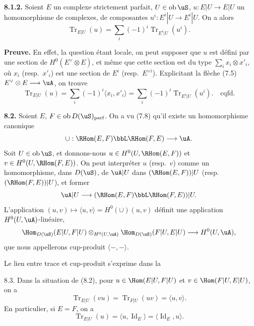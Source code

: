 \smallskip
\noindent\textbf{8.1.2.} Soient $E$ un complexe strictement parfait, $U \in \operatorname{ob} \uS$, $u : E|U \rightarrow E|U$ un homomorphisme de complexes, de composantes $u^i : E^i|U \rightarrow E^i|U$. On a alors
\[
\operatorname{Tr}_{E|U}(u) = \sum_i (-1)^i \operatorname{Tr}_{E^i|U}(u^i) .
\]

\noindent\textbf{Preuve.} En effet, la question \'{e}tant locale, on peut supposer que $u$ est d\'{e}fini par une section de $H^0(E^{\vee} \otimes E)$, et m\^{e}me que cette section est du type $\sum_i x_i \otimes x'_i$, o\`{u} $x_i$ (resp.~$x'_i$) est une section de $E^i$ (resp.~$E^{\vee i}$). Explicitant la fl\`{e}che (7.5) $E^{\vee} \otimes E \longrightarrow \uA$, on trouve
\[
\operatorname{Tr}_{E|U}(u) = \sum_i (-1)^i \langle x_i, x'_i \rangle = \sum_i (-1)^i \operatorname{Tr}_{E^i|U}(u^i) . \quad \text{cqfd.}
\]

\bigskip
\noindent\textbf{8.2.} Soient $E$, $F \in \operatorname{ob} D(\uS)_{\mathrm{parf}}$. On a vu (7.8) qu'il existe un homomorphisme canonique
\[
\cup : \RHom(E,F) \bbL \RHom(F,E) \longrightarrow \uA .
\]
Soit $U \in \operatorname{ob} \uS$, et donnons-nous $u \in H^0(U, \RHom(E,F))$ et $v \in H^0(U, \RHom(F,E))$. On peut interpr\'{e}ter $u$ (resp.~$v$) comme un homomorphisme, dans $D(\uS)$, de $\uA|U$ dans $(\RHom(E,F))|U$ (resp.~$(\RHom(F,E))|U$), et former
\[
\uA|U \longrightarrow (\RHom(E,F) \bbL \RHom(F,E))|U .
\]
L'application $(u,v) \mapsto \langle u,v \rangle = H^0(\cup)(u,v)$ d\'{e}finit une application $H^0(U,\uA)$-lin\'{e}aire,
\[
\Hom_{D(\uS)}(E|U, F|U) \otimes_{H^0(U,\uA)} \Hom_{D(\uS)}(F|U, E|U) \longrightarrow H^0(U,\uA) ,
\]
que nous appellerons cup-produit $\langle -,- \rangle$.

Le lien entre trace et cup-produit s'exprime dans la

\begin{proposition} 8.3.
Dans la situation de (8.2), pour $u \in \Hom(E|U, F|U)$ et $v \in \Hom(F|U, E|U)$, on a
\[
\operatorname{Tr}_{E|U}(vu) = \operatorname{Tr}_{F|U}(uv) = \langle u,v \rangle .
\]
En particulier, si $E = F$, on a
\[
\operatorname{Tr}_{E|U}(u) = \langle u, \operatorname{Id}_E \rangle = \langle \operatorname{Id}_E, u \rangle .
\]
\end{proposition}

